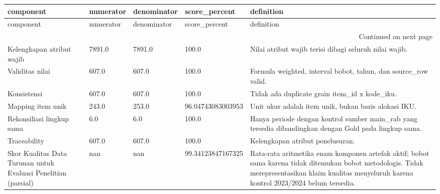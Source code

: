 \begingroup
\scriptsize
\begin{longtable}{lllll}
\toprule
component & numerator & denominator & score_percent & definition \\
\midrule
\endfirsthead
\toprule
component & numerator & denominator & score_percent & definition \\
\midrule
\endhead
\midrule
\multicolumn{5}{r}{Continued on next page} \\
\midrule
\endfoot
\bottomrule
\endlastfoot
Kelengkapan atribut wajib & 7891.0 & 7891.0 & 100.0 & Nilai atribut wajib terisi dibagi seluruh nilai wajib. \\
Validitas nilai & 607.0 & 607.0 & 100.0 & Formula weighted, interval bobot, tahun, dan source\_row valid. \\
Konsistensi & 607.0 & 607.0 & 100.0 & Tidak ada duplicate grain item\_id x kode\_iku. \\
Mapping item unik & 243.0 & 253.0 & 96.04743083003953 & Unit ukur adalah item unik, bukan baris alokasi IKU. \\
Rekonsiliasi lingkup sama & 6.0 & 6.0 & 100.0 & Hanya periode dengan kontrol sumber main\_rab yang tersedia dibandingkan dengan Gold pada lingkup sama. \\
Traceability & 607.0 & 607.0 & 100.0 & Kelengkapan atribut penelusuran. \\
Skor Kualitas Data Turunan untuk Evaluasi Penelitian (parsial) & nan & nan & 99.34123847167325 & Rata-rata aritmetika enam komponen artefak aktif; bobot sama karena tidak ditemukan bobot metodologis. Tidak merepresentasikan klaim kualitas menyeluruh karena kontrol 2023/2024 belum tersedia. \\
\end{longtable}
\endgroup
